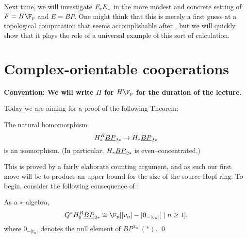 Next time, we will investigate $F_* \underline{\smash{E}}_{*}$ in the more modest and concrete setting of $F = H\F_p$ and $E = BP$.  One might think that this is merely a first guess at a topological computation that seems accomplishable after , but we will quickly show that it plays the role of a universal example of this sort of calculation.







\section{Complex-orientable cooperations}\label{COableCoopnsII}

\begin{center}
\textbf{Convention: We will write $H$ for $H\F_p$ for the duration of the lecture.}
\end{center}

Today we are aiming for a proof of the following Theorem:

\begin{theorem}\label{HFpBPCooperationsTheorem}
The natural homomorphism \[H_*^R \underline{\smash{BP}}_{2*} \to H_* \underline{\smash{BP}}_{2*}\] is an isomorphism.  (In particular, $H_* \underline{\smash{BP}}_{2*}$ is even--concentrated.)
\end{theorem}

\noindent This is proved by a fairly elaborate counting argument, and as such our first move will be to produce an upper bound for the size of the source Hopf ring.  To begin, consider the following consequence of :

\begin{corollary}
As a $\circ$--algebra, \[Q^* H_0^R \OS{BP}{2*} \cong \F_p[[v_n] - [0_{-|v_n|}] \mid n \ge 1],\] where $0_{-|v_n|}$ denotes the null element of $BP^{|v_n|}(*)$. \qed
\end{corollary}

